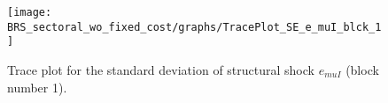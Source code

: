 \begin{figure}[H]
\centering
  \texttt{[image: BRS\_sectoral\_wo\_fixed\_cost/graphs/TracePlot\_SE\_e\_muI\_blck\_1]}\\
    \caption{Trace plot for the standard deviation of structural shock ${e_{muI}}$ (block number 1).}
\end{figure}
